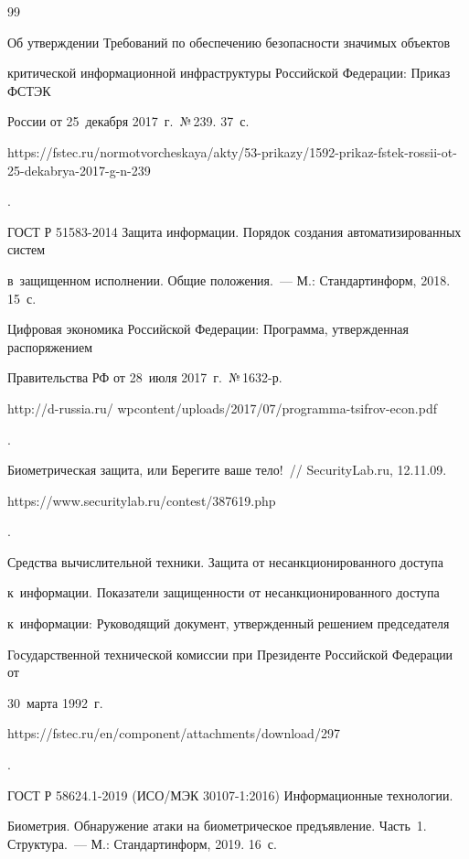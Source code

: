 {{\begin{thebibliography}{99}


Об утверждении Требований по обеспечению безопасности значимых объектов 


критической информационной инфраструктуры Российской Федерации: Приказ ФСТЭК 


России от 25~декабря 2017~г.\ №\,239. 37~с.


{\sf 


https://fstec.ru/\linebreak normotvorcheskaya/akty/53-prikazy/1592-prikaz-fstek-rossii-ot-25-dekabrya-2017-g-n-239}.




ГОСТ Р 51583-2014 Защита информации. Порядок создания автоматизированных сис\-тем 


в~защищенном исполнении. Общие положения.~--- М.: Стандартинформ, 2018. 15~с.




Цифровая экономика Российской Федерации: Программа, утвержденная распоряжением 


Правительства РФ от 28~июля 2017~г.\ №\,1632-р.


{\sf 


http://d-russia.ru/ wpcontent/uploads/2017/07/programma-tsifrov-econ.pdf}.




Биометрическая защита, или Берегите ваше тело!~/\!\!/ SecurityLab.ru, 12.11.09. {\sf 


https://www.securitylab.ru/contest/387619.php}.




Средства вычислительной техники. Защита от несанкционированного доступа 


к~информации. Показатели защищенности от несанкционированного доступа 


к~информации: Руководящий документ, утвержденный решением председателя 


Государственной технической комиссии при Президенте Российской Федерации от 


30~марта 1992~г. {\sf 


https://fstec.ru/en/component/attachments/download/297}.




ГОСТ Р 58624.1-2019 (ИСО/МЭК 30107-1:2016) Информационные технологии. 


Биометрия. Обнаружение атаки на биометрическое предъявление. Часть~1. Структура.~--- М.: Стандартинформ, 2019. 16~с. 



\end{thebibliography}}}
